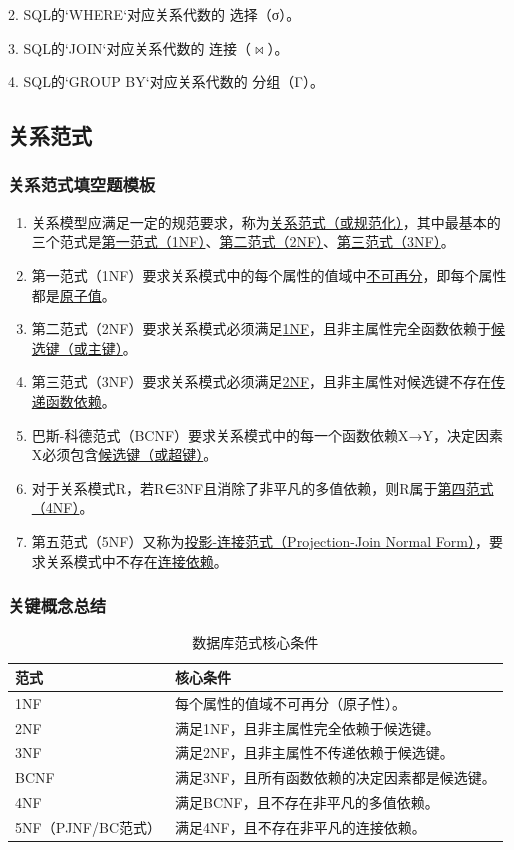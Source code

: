 \documentclass[a4paper,12pt,UTF8,fontset=none]{ctexart}
\begin{document}
2. SQL的`WHERE`对应关系代数的 选择（σ）。

3. SQL的`JOIN`对应关系代数的 连接（$\Join$）。  

4. SQL的`GROUP BY`对应关系代数的 分组（Γ）。

\subsection{关系范式}
\subsubsection{关系范式填空题模板}
\begin{enumerate}
  \item 关系模型应满足一定的规范要求，称为\underline{关系范式（或规范化）}，其中最基本的三个范式是\underline{第一范式（1NF）}、\underline{第二范式（2NF）}、\underline{第三范式（3NF）}。
  
  \item 第一范式（1NF）要求关系模式中的每个属性的值域中\underline{不可再分}，即每个属性都是\underline{原子值}。
  
  \item 第二范式（2NF）要求关系模式必须满足\underline{1NF}，且非主属性完全函数依赖于\underline{候选键（或主键）}。
  
  \item 第三范式（3NF）要求关系模式必须满足\underline{2NF}，且非主属性对候选键不存在\underline{传递函数依赖}。
  
  \item 巴斯-科德范式（BCNF）要求关系模式中的每一个函数依赖X→Y，决定因素X必须包含\underline{候选键（或超键）}。
  
  \item 对于关系模式R，若R∈3NF且消除了非平凡的多值依赖，则R属于\underline{第四范式（4NF）}。
  
  \item 第五范式（5NF）又称为\underline{投影-连接范式（Projection-Join Normal Form）}，要求关系模式中不存在\underline{连接依赖}。
\end{enumerate}

\subsubsection{关键概念总结}
\begin{table}[htbp]
  \centering
  \caption{数据库范式核心条件}
  \label{tab:normal-forms}
  \begin{tabular}{lp{}}
  \toprule
  \textbf{范式} & \textbf{核心条件} \\
  \midrule
  1NF & 每个属性的值域不可再分（原子性）。 \\
  2NF & 满足1NF，且非主属性完全依赖于候选键。 \\
  3NF & 满足2NF，且非主属性不传递依赖于候选键。 \\
  BCNF & 满足3NF，且所有函数依赖的决定因素都是候选键。 \\
  4NF & 满足BCNF，且不存在非平凡的多值依赖。 \\
  5NF（PJNF/BC范式） & 满足4NF，且不存在非平凡的连接依赖。 \\
  \bottomrule
  \end{tabular}
  \end{table}
\end{document}
